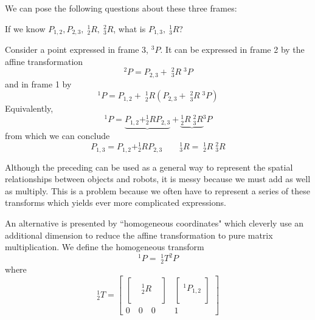 We can pose the following questions about these three frames:

If we know $P_{1,2}, P_{2,3}, \;^1_2R, \; ^2_3R$, what is $P_{1,3}, \;^1_3R$?

Consider a point expressed in frame 3, $^3P$.  It can be expressed in frame 2 by the affine transformation
\[
^2P = P_{2,3}+ \;{}^2_3R \;{}^3P
\]
and in frame 1 by
\[
^1P = P_{1,2} + \;{}^1_2R(P_{2,3}+ \;{}^2_3R \;{}^3P)
\]
Equivalently,
\[
^1P = \underbrace{P_{1,2} + ^1_2RP_{2,3}}{}+ \underbrace{^1_2R\;^2_3R}{} ^3P
\]
from which we can conclude
\[
P_{1,3} = P_{1,2} + ^1_2RP_{2,3} \qquad  ^1_3R = \;{}^1_2R\;^2_3R
\]


Although the preceding can be used as a general way to represent the spatial relationships between objects and robots, it is messy because we must add as well as multiply.  This is a problem because we often have to represent a series of these transforms which yields ever more complicated expressions.

An alternative is presented by ``homogeneous coordinates" which cleverly use an additional dimension to reduce the affine transformation to pure matrix multiplication.  We define the homogeneous transform
\[
^1P = \;{}^1_2T^2P
\]
where
\[
^1_2T =
\begin{bmatrix}
\begin{bmatrix}  &  &  \\  & ^1_2R&  \\ & & \\ \end{bmatrix}      &
 \begin{bmatrix}  \\ ^1P_{1,2} \\  \\ \end{bmatrix}            \\
 0 \quad 0 \quad 0      &   1
\end{bmatrix}
\]

